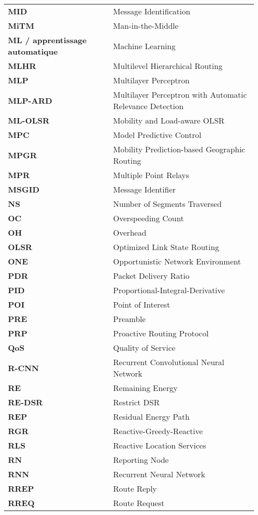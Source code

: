 \begin{longtable}{p{4cm} p{11cm}}
\textbf{MID} & Message Identification \\
\textbf{MiTM} & Man-in-the-Middle \\
\textbf{ML / apprentissage automatique} & Machine Learning \\
\textbf{MLHR} & Multilevel Hierarchical Routing \\
\textbf{MLP} & Multilayer Perceptron \\
\textbf{MLP-ARD} & Multilayer Perceptron with Automatic Relevance Detection \\
\textbf{ML-OLSR} & Mobility and Load-aware OLSR \\
\textbf{MPC} & Model Predictive Control \\
\textbf{MPGR} & Mobility Prediction-based Geographic Routing \\
\textbf{MPR} & Multiple Point Relays \\
\textbf{MSGID} & Message Identifier \\
\textbf{NS} & Number of Segments Traversed \\
\textbf{OC} & Overspeeding Count \\
\textbf{OH} & Overhead \\
\textbf{OLSR} & Optimized Link State Routing \\
\textbf{ONE} & Opportunistic Network Environment \\
\textbf{PDR} & Packet Delivery Ratio \\
\textbf{PID} & Proportional-Integral-Derivative \\
\textbf{POI} & Point of Interest \\
\textbf{PRE} & Preamble \\
\textbf{PRP} & Proactive Routing Protocol \\
\textbf{QoS} & Quality of Service \\
\textbf{R-CNN} & Recurrent Convolutional Neural Network \\
\textbf{RE} & Remaining Energy \\
\textbf{RE-DSR} & Restrict DSR \\
\textbf{REP} & Residual Energy Path \\
\textbf{RGR} & Reactive-Greedy-Reactive \\
\textbf{RLS} & Reactive Location Services \\
\textbf{RN} & Reporting Node \\
\textbf{RNN} & Recurrent Neural Network \\
\textbf{RREP} & Route Reply \\
\textbf{RREQ} & Route Request \\

\end{longtable}

